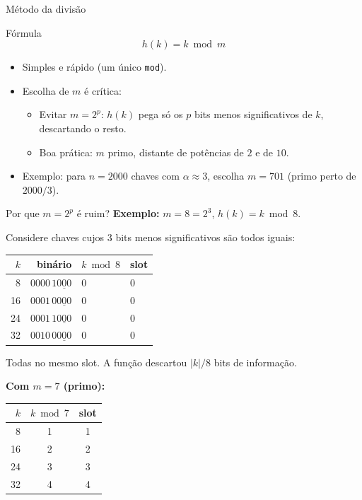 \documentclass[aspectratio=169]{beamer}
\begin{document}
\begin{frame}{Método da divisão}
\begin{block}{Fórmula}
$$h(k) = k \bmod m$$
\end{block}
\begin{itemize}
\item Simples e rápido (um único \texttt{mod}).
\item Escolha de $m$ é crítica:
\begin{itemize}
\item Evitar $m = 2^p$: $h(k)$ pega só os $p$ bits menos significativos de $k$, descartando o resto.
\item \alert{Boa prática:} $m$ primo, distante de potências de $2$ e de $10$.
\end{itemize}
\item Exemplo: para $n = 2000$ chaves com $\alpha \approx 3$, escolha $m = 701$ (primo perto de $2000/3$).
\end{itemize}
\end{frame}

\begin{frame}[shrink=20]{Por que $m = 2^p$ é ruim?}
\textbf{Exemplo:} $m = 8 = 2^3$, $h(k) = k \bmod 8$.

\smallskip
Considere chaves cujos $3$ bits menos significativos são todos iguais:
\centering
\begin{tabular}{rrll}
\toprule
$k$ & binário & $k \bmod 8$ & slot \\
\midrule
8 & $0000\,1\underline{000}$ & 0 & 0 \\
16 & $0001\,0\underline{000}$ & 0 & 0 \\
24 & $0001\,1\underline{000}$ & 0 & 0 \\
32 & $0010\,0\underline{000}$ & 0 & 0 \\
\bottomrule
\end{tabular}

\smallskip
\alert{Todas no mesmo slot.} A função descartou $|k|/8$ bits de informação.

\smallskip
\textbf{Com $m = 7$ (primo):}
\centering
\begin{tabular}{rcc}
\toprule
$k$ & $k \bmod 7$ & slot \\
\midrule
8 & 1 & 1 \\
16 & 2 & 2 \\
24 & 3 & 3 \\
32 & 4 & 4 \\
\bottomrule
\end{tabular}
\end{frame}
\end{document}
